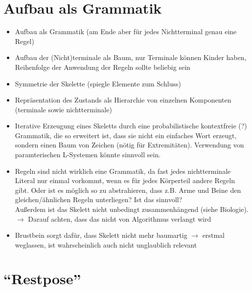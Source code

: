 \section{Aufbau als Grammatik}

\begin{itemize}
  \item Aufbau als Grammatik (am Ende aber für jedes Nichtterminal genau eine Regel)
  \item Aufbau der (Nicht)terminale als Baum, nur Terminale können Kinder haben, Reihenfolge der Anwendung der Regeln sollte beliebig sein
  \item Symmetrie der Skelette (spiegle Elemente zum Schluss)
  \item Repräsentation des Zustands als Hierarchie von einzelnen Komponenten (terminale sowie nichtterminale)
 \end{itemize}
 
 \begin{itemize}
  \item Iterative Erzeugung eines Skeletts durch eine probabilistische kontextfreie (?) Grammatik, die so erweitert ist, dass sie nicht ein einfaches Wort erzeugt, sondern einen Baum von Zeichen (nötig für Extremitäten). Verwendung von paramterischen L-Systemen \cite{Paramteric_L-Systems} könnte sinnvoll sein.
  
  \item Regeln sind nicht wirklich eine Grammatik, da fast jedes nichtterminale Literal nur einmal vorkommt, wenn es für jedes Körperteil andere Regeln gibt. Oder ist es möglich so zu abstrahieren, dass z.B. Arme und Beine den gleichen/ähnlichen Regeln unterliegen? Ist das sinnvoll? \\
  Außerdem ist das Skelett nicht unbedingt zusammenhängend (siehe Biologie). $\rightarrow$ Darauf achten, dass das nicht von Algorithmus verlangt wird
  
  \item Brustbein sorgt dafür, dass Skelett nicht mehr baumartig $\rightarrow$ erstmal weglassen, ist wahrscheinlich auch nicht unglaublich relevant
 \end{itemize}

 

\section{"`Restpose"'}

